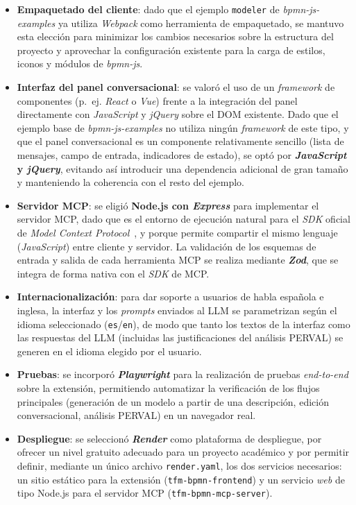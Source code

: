 {\begin{itemize}
    \item \textbf{Empaquetado del cliente}: dado que el ejemplo \texttt{modeler} de \textit{bpmn-js-examples} ya utiliza \textit{Webpack} como herramienta de empaquetado, se mantuvo esta elección para minimizar los cambios necesarios sobre la estructura del proyecto y aprovechar la configuración existente para la carga de estilos, iconos y módulos de \textit{bpmn-js}.
    \item \textbf{Interfaz del panel conversacional}: se valoró el uso de un \textit{framework} de componentes (p.~ej. \textit{React} o \textit{Vue}) frente a la integración del panel directamente con \textit{JavaScript} y \textit{jQuery} sobre el DOM existente. Dado que el ejemplo base de \textit{bpmn-js-examples} no utiliza ningún \textit{framework} de este tipo, y que el panel conversacional es un componente relativamente sencillo (lista de mensajes, campo de entrada, indicadores de estado), se optó por \textbf{\textit{JavaScript} y \textit{jQuery}}, evitando así introducir una dependencia adicional de gran tamaño y manteniendo la coherencia con el resto del ejemplo.
    \item \textbf{Servidor MCP}: se eligió \textbf{Node.js con \textit{Express}} para implementar el servidor MCP, dado que es el entorno de ejecución natural para el \textit{SDK} oficial de \textit{Model Context Protocol}~\cite{anthropic2024mcp}, y porque permite compartir el mismo lenguaje (\textit{JavaScript}) entre cliente y servidor. La validación de los esquemas de entrada y salida de cada herramienta MCP se realiza mediante \textbf{\textit{Zod}}, que se integra de forma nativa con el \textit{SDK} de MCP.
    \item \textbf{Internacionalización}: para dar soporte a usuarios de habla española e inglesa, la interfaz y los \textit{prompts} enviados al LLM se parametrizan según el idioma seleccionado (\texttt{es}/\texttt{en}), de modo que tanto los textos de la interfaz como las respuestas del LLM (incluidas las justificaciones del análisis PERVAL) se generen en el idioma elegido por el usuario.
    \item \textbf{Pruebas}: se incorporó \textbf{\textit{Playwright}} para la realización de pruebas \textit{end-to-end} sobre la extensión, permitiendo automatizar la verificación de los flujos principales (generación de un modelo a partir de una descripción, edición conversacional, análisis PERVAL) en un navegador real.
    \item \textbf{Despliegue}: se seleccionó \textbf{\textit{Render}} como plataforma de despliegue, por ofrecer un nivel gratuito adecuado para un proyecto académico y por permitir definir, mediante un único archivo \texttt{render.yaml}, los dos servicios necesarios: un sitio estático para la extensión (\texttt{tfm-bpmn-frontend}) y un servicio \textit{web} de tipo Node.js para el servidor MCP (\texttt{tfm-bpmn-mcp-server}).
\end{itemize}

}
